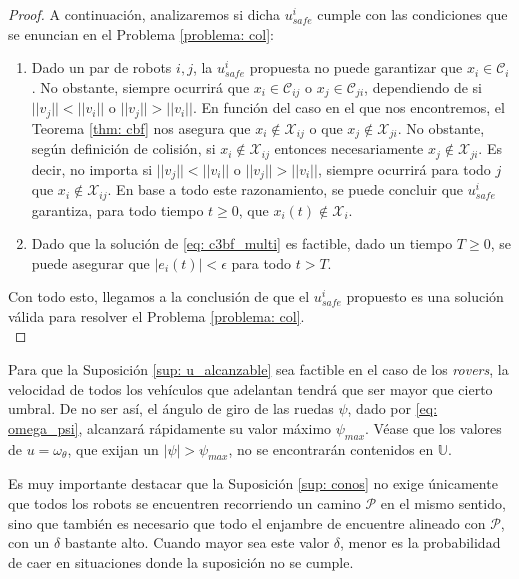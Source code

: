 \begin{proof}
    A continuación, analizaremos si dicha $u_{safe}^{i}$ cumple con las condiciones que se enuncian en el Problema \eqref{problema: col}:
    
    \begin{enumerate}
        \item Dado un par de robots $i,j$, la $u_{safe}^{i}$ propuesta no puede garantizar que $x_i \in \mathcal{C}_i$. No obstante, siempre ocurrirá que $x_i \in \mathcal{C}_{ij}$ o $x_j \in \mathcal{C}_{ji}$, dependiendo de si $||v_j|| < ||v_i||$ o $||v_j|| > ||v_i||$. En función del caso en el que nos encontremos, el Teorema \ref{thm: cbf} nos asegura que $x_i \notin \mathcal{X}_{ij}$ o que $x_j \notin \mathcal{X}_{ji}$. No obstante, según definición de colisión, si $x_i \notin \mathcal{X}_{ij}$ entonces necesariamente $x_j \notin \mathcal{X}_{ji}$. Es decir, no importa si $||v_j|| < ||v_i||$ o $||v_j|| > ||v_i||$, siempre ocurrirá para todo $j$ que $x_i \notin \mathcal{X}_{ij}$. En base a todo este razonamiento, se puede concluir que $u_{safe}^{i}$ garantiza, para todo tiempo $t \geq 0$, que $x_i(t) \notin \mathcal{X}_{i}$.\\

        \item Dado que la solución de \ref{eq: c3bf_multi} es factible, dado un tiempo $T \geq 0$, se puede asegurar que $|e_i(t)| < \epsilon$ para todo $t > T$.
    \end{enumerate}

    Con todo esto, llegamos a la conclusión de que el $u_{safe}^{i}$ propuesto es una solución válida para resolver el Problema \eqref{problema: col}.\\
\end{proof}

Para que la Suposición \ref{sup: u_alcanzable} sea factible en el caso de los \textit{rovers}, la velocidad de todos los vehículos que adelantan tendrá que ser mayor que cierto umbral. De no ser así, el ángulo de giro de las ruedas $\psi$, dado por \eqref{eq: omega_psi}, alcanzará rápidamente su valor máximo $\psi_{max}$. Véase que los valores de $u = \omega_\theta$, que exijan un $|\psi| > \psi_{max}$, no se encontrarán contenidos en $\mathds{U}$.

\newpage

Es muy importante destacar que la Suposición \ref{sup: conos} no exige únicamente que todos los robots se encuentren recorriendo un camino $\mathcal{P}$ en el mismo sentido, sino que también es necesario que todo el enjambre de encuentre alineado con $\mathcal{P}$, con un $\delta$ bastante alto. Cuando mayor sea este valor $\delta$, menor es la probabilidad de caer en situaciones donde la suposición no se cumple. 


